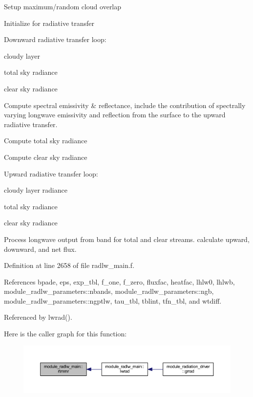 \begin{DoxyEnumerate}
\item Setup maximum/random cloud overlap
\item Initialize for radiative transfer
\item Downward radiative transfer loop\+:
\begin{DoxyItemize}
\item cloudy layer
\item total sky radiance
\item clear sky radiance
\end{DoxyItemize}
\item Compute spectral emissivity \& reflectance, include the contribution of spectrally varying longwave emissivity and reflection from the surface to the upward radiative transfer.
\item Compute total sky radiance
\item Compute clear sky radiance
\item Upward radiative transfer loop\+:
\begin{DoxyItemize}
\item cloudy layer radiance
\item total sky radiance
\item clear sky radiance
\end{DoxyItemize}
\item Process longwave output from band for total and clear streams. calculate upward, downward, and net flux. 
\end{DoxyEnumerate}

Definition at line 2658 of file radlw\+\_\+main.\+f.



References bpade, eps, exp\+\_\+tbl, f\+\_\+one, f\+\_\+zero, fluxfac, heatfac, lhlw0, lhlwb, module\+\_\+radlw\+\_\+parameters\+::nbands, module\+\_\+radlw\+\_\+parameters\+::ngb, module\+\_\+radlw\+\_\+parameters\+::ngptlw, tau\+\_\+tbl, tblint, tfn\+\_\+tbl, and wtdiff.



Referenced by lwrad().



Here is the caller graph for this function\+:\nopagebreak
\begin{figure}[H]
\begin{center}
\leavevmode
\includegraphics[width=350pt]{namespacemodule__radlw__main_ad8f07b8a0e3dfa639b970d756824b9d3_icgraph}
\end{center}
\end{figure}


